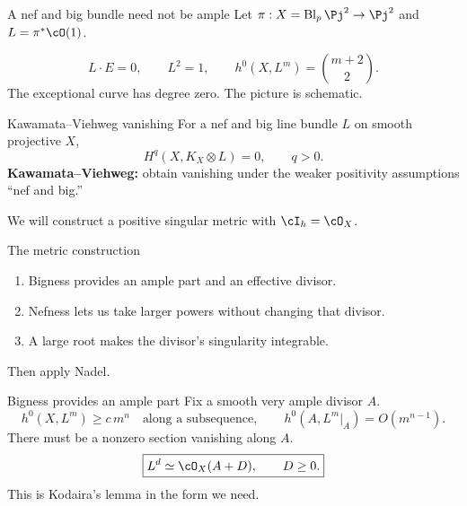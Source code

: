 \begin{frame}{A nef and big bundle need not be ample}
Let \(\pi:X=\operatorname{Bl}_p\Pj^2\to\Pj^2\) and \(L=\pi^*\cO(1)\).
\begin{center}
\end{center}
\[
L\cdot E=0,\qquad L^2=1,\qquad
h^0(X,L^m)=\binom{m+2}{2}.
\]
The exceptional curve has degree zero. The picture is schematic.
\end{frame}

\begin{frame}{Kawamata--Viehweg vanishing}
For a nef and big line bundle \(L\) on smooth projective \(X\),
\[
\boxed{H^q(X,K_X\otimes L)=0,\qquad q>0.}
\]
\bigskip
\textbf{Kawamata--Viehweg:} obtain vanishing under the weaker positivity assumptions \textquotedblleft nef and big.\textquotedblright
\bigskip
\par We will construct a positive singular metric with \(\cI_h=\cO_X\).
\end{frame}

\begin{frame}{The metric construction}
\begin{enumerate}
\setlength{\itemsep}{15pt}
\item Bigness provides an ample part and an effective divisor.
\item Nefness lets us take larger powers without changing that divisor.
\item A large root makes the divisor's singularity integrable.
\end{enumerate}
\bigskip
Then apply Nadel.
\end{frame}

\begin{frame}{Bigness provides an ample part}
Fix a smooth very ample divisor \(A\).
\[
h^0(X,L^m)\ge c\,m^n
\quad\text{along a subsequence},\qquad
h^0(A,L^m|_A)=O(m^{n-1}).
\]
There must be a nonzero section vanishing along \(A\).
\[
\boxed{L^d\simeq\cO_X(A+D),\qquad D\ge0.}
\]
This is Kodaira's lemma in the form we need.
\end{frame}


